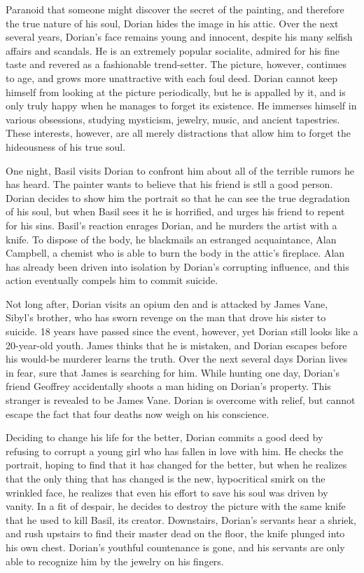 \documentclass[12pt,twoside,titlepage,a4paper]{article}
\begin{document}
	Paranoid that someone might discover the secret of the painting, and therefore the true nature of his soul, Dorian hides the image in his attic. Over the next several years, Dorian's face remains young and innocent, despite his many selfish affairs and scandals. He is an extremely popular socialite, admired for his fine taste and revered as a fashionable trend-setter. The picture, however, continues to age, and grows more unattractive with each foul deed. Dorian cannot keep himself from looking at the picture periodically, but he is appalled by it, and is only truly happy when he manages to forget its existence. He immerses himself in various obsessions, studying mysticism, jewelry, music, and ancient tapestries. These interests, however, are all merely distractions that allow him to forget the hideousness of his true soul.
	
	One night, Basil visits Dorian to confront him about all of the terrible rumors he has heard. The painter wants to believe that his friend is stll a good person. Dorian decides to show him the portrait so that he can see the true degradation of his soul, but when Basil sees it he is horrified, and urges his friend to repent for his sins. Basil's reaction enrages Dorian, and he murders the artist with a knife. To dispose of the body, he blackmails an estranged acquaintance, Alan Campbell, a chemist who is able to burn the body in the attic's fireplace. Alan has already been driven into isolation by Dorian's corrupting influence, and this action eventually compels him to commit suicide.
	
	Not long after, Dorian visits an opium den and is attacked by James Vane, Sibyl's brother, who has sworn revenge on the man that drove his sister to suicide. 18 years have passed since the event, however, yet Dorian still looks like a 20-year-old youth. James thinks that he is mistaken, and Dorian escapes before his would-be murderer learns the truth. Over the next several days Dorian lives in fear, sure that James is searching for him. While hunting one day, Dorian's friend Geoffrey accidentally shoots a man hiding on Dorian's property. This stranger is revealed to be James Vane. Dorian is overcome with relief, but cannot escape the fact that four deaths now weigh on his conscience.
	
	Deciding to change his life for the better, Dorian commits a good deed by refusing to corrupt a young girl who has fallen in love with him. He checks the portrait, hoping to find that it has changed for the better, but when he realizes that the only thing that has changed is the new, hypocritical smirk on the wrinkled face, he realizes that even his effort to save his soul was driven by vanity. In a fit of despair, he decides to destroy the picture with the same knife that he used to kill Basil, its creator. Downstairs, Dorian's servants hear a shriek, and rush upstairs to find their master dead on the floor, the knife plunged into his own chest. Dorian's youthful countenance is gone, and his servants are only able to recognize him by the jewelry on his fingers.
	
\end{document}
